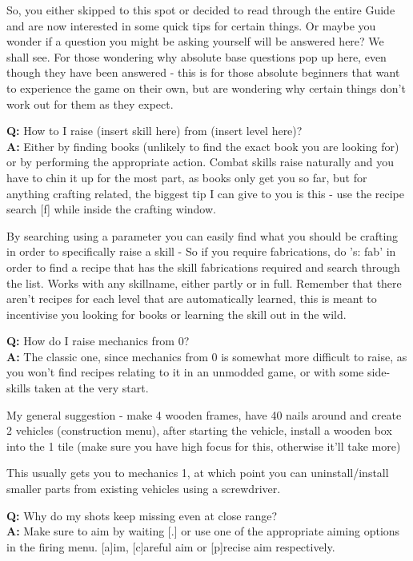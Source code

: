 \documentclass[11pt]{report}
\begin{document}
So, you either skipped to this spot or decided to read through the entire Guide and are now interested in some quick tips for certain things. Or maybe you wonder if a question you might be asking yourself will be answered here? We shall see. For those wondering why absolute base questions pop up here, even though they have been answered - this is for those absolute beginners that want to experience the game on their own, but are wondering why certain things don't work out for them as they expect.

\textbf{Q:} How to I raise (insert skill here) from (insert level here)?\\
\textbf{A:} Either by finding books (unlikely to find the exact book you are looking for) or by performing the appropriate action. Combat skills raise naturally and you have to chin it up for the most part, as books only get you so far, but for anything crafting related, the biggest tip I can give to you is this - use the recipe search [f] while inside the crafting window.

By searching using a parameter you can easily find what you should be crafting in order to specifically raise a skill - So if you require fabrications, do 's: fab' in order to find a recipe that has the skill fabrications required and search through the list. Works with any skillname, either partly or in full. Remember that there aren't recipes for each level that are automatically learned, this is meant to incentivise you looking for books or learning the skill out in the wild.

\textbf{Q:} How do I raise mechanics from 0?\\
\textbf{A:} The classic one, since mechanics from 0 is somewhat more difficult to raise, as you won't find recipes relating to it in an unmodded game, or with some side-skills taken at the very start.

My general suggestion - make 4 wooden frames, have 40 nails around and create 2 vehicles (construction menu), after starting the vehicle, install a wooden box into the 1 tile (make sure you have high focus for this, otherwise it'll take more)

This usually gets you to mechanics 1, at which point you can uninstall/install smaller parts from existing vehicles using a screwdriver.

\textbf{Q:} Why do my shots keep missing even at close range?\\
\textbf{A:} Make sure to aim by waiting [.] or use one of the appropriate aiming options in the firing menu. [a]im, [c]areful aim or [p]recise aim respectively.
\end{document}
